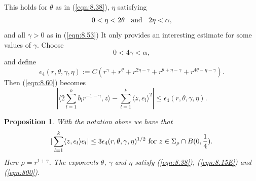 \documentclass[12pt,leqno]{article}
\theoremstyle{plain}
\newtheorem{prop}[thm]{Proposition}
{\theorembodyfont{\rmfamily}
\newtheorem{defn}[thm]{Definition}}
{\theorembodyfont{\rmfamily}
\newtheorem{rem}[thm]{Remark}}
\numberwithin{equation}{section}
\begin{document}
This holds for $\theta$ as in (\ref{eqn:8.38}), $\eta$ satisfying
\begin{equation}\label{eqn:8.15E}
0<\eta<2\theta\;\;\hbox{ and }\;\;2\eta<\alpha,
\end{equation}
and all $\gamma>0$ as in (\ref{eqn:8.53})
It only provides an interesting estimate for some values of $\gamma$.
Choose
\begin{equation}\label{eqn:800}
0<4\gamma<\alpha,
\end{equation}
and define
\begin{equation}\label{eqn8:60E}
\epsilon_4(r,\theta,\gamma,\eta):=C
(r^{\gamma}+r^\theta +r^{2\eta-\gamma}
+ r^{\theta+\eta-\gamma} + r^{4\theta-\eta-\gamma}).
\end{equation}
Then (\ref{eqn:8.60}) becomes
\begin{equation}\label{eqn:8.60EE}
|\langle 2\sum_{l=1}^k b_lr^{-1-\gamma}, z\rangle-
\sum_{l=1}^k\langle z,e_l\rangle^2|\le \epsilon_4(r,\theta,\gamma,\eta).
\end{equation}



\begin{prop}\label{prop:8.101}
With the notation above we have that
\begin{equation}\label{eqn:8.61}
|\sum_{l=1}^k\langle z,  e_l \rangle e_l|\le
3\epsilon_4(r,\theta,\gamma,\eta)^{1/2}
\hbox{ for }
z\in\Sigma_\rho\cap B(0, \frac{1}{4}).
\end{equation}
Here $\rho=r^{1+\gamma}$. The exponents $\theta$, $\gamma$ and $\eta$ satisfy
(\ref{eqn:8.38}), (\ref{eqn:8.15E}) and (\ref{eqn:800}).
\end{prop}
\end{document}
